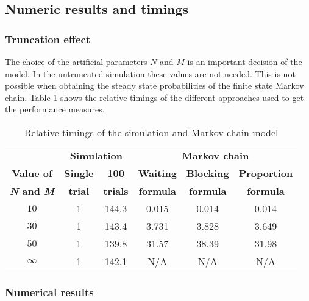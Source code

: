 \subsection{Numeric results and timings}\label{sec:truncation_effect}


\subsubsection{Truncation effect}

The choice of the artificial parameters \(N\) and \(M\) is an important 
decision of the model.
In the untruncated simulation these values are not needed.
This is not possible when obtaining the steady state probabilities of the
finite state Markov chain.
Table \ref{tab:truncation_effect_timings} shows the relative timings of the
different approaches used to get the performance measures.

\tiny
\begin{table}[ht]
    \centering
    \begin{tabular}{c|cc|ccc}
        & \multicolumn{2}{c}{\textbf{Simulation}} & 
        \multicolumn{3}{c}{\textbf{Markov chain}} \\
        \textbf{Value of} & \textbf{Single} & \textbf{100} & 
        \textbf{Waiting} & \textbf{Blocking} & 
        \textbf{Proportion} \\
        \textbf{\textit{N} and \textit{M}} & \textbf{trial} & \textbf{trials} & 
        \textbf{formula} & \textbf{formula} & \textbf{formula} \\
        \hline
        \(10\) & 1 & 144.3 & 0.015 & 0.014 & 0.014 \\
        \hline
        \(30\) & 1 & 143.4 & 3.731 & 3.828 & 3.649 \\
        \hline
        \(50\) & 1 & 139.8 & 31.57 & 38.39 & 31.98 \\
        \hline
        \(\infty\) & 1 & 142.1 & N/A & N/A & N/A \\
    \end{tabular}
    \caption{Relative timings of the simulation and Markov chain model}
    \label{tab:truncation_effect_timings}
\end{table}
\normalsize


\subsubsection{Numerical results}